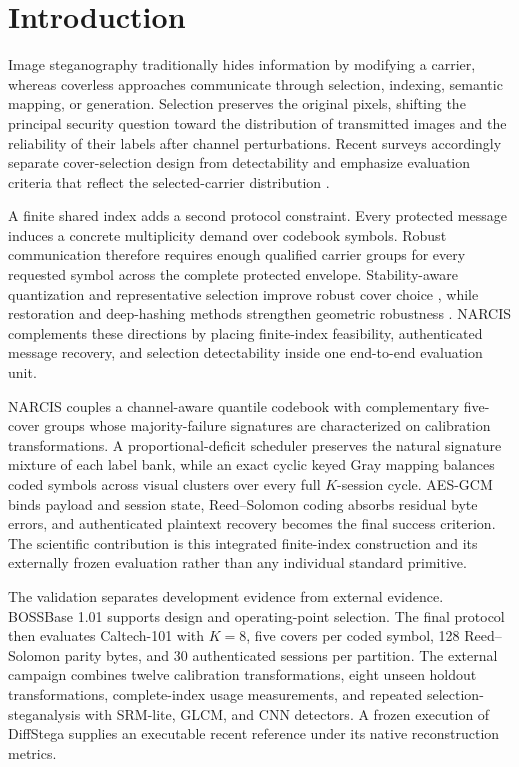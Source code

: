\section{Introduction}
\label{sec:intro}

Image steganography traditionally hides information by modifying a carrier, whereas coverless approaches communicate through selection, indexing, semantic mapping, or generation. Selection preserves the original pixels, shifting the principal security question toward the distribution of transmitted images and the reliability of their labels after channel perturbations. Recent surveys accordingly separate cover-selection design from detectability and emphasize evaluation criteria that reflect the selected-carrier distribution \cite{azam2025coversurvey,kombrink2025survey}.

A finite shared index adds a second protocol constraint. Every protected message induces a concrete multiplicity demand over codebook symbols. Robust communication therefore requires enough qualified carrier groups for every requested symbol across the complete protected envelope. Stability-aware quantization and representative selection improve robust cover choice \cite{guo2026capacity}, while restoration and deep-hashing methods strengthen geometric robustness \cite{meng2025restoration,tan2026hashing}. NARCIS complements these directions by placing finite-index feasibility, authenticated message recovery, and selection detectability inside one end-to-end evaluation unit.

NARCIS couples a channel-aware quantile codebook with complementary five-cover groups whose majority-failure signatures are characterized on calibration transformations. A proportional-deficit scheduler preserves the natural signature mixture of each label bank, while an exact cyclic keyed Gray mapping balances coded symbols across visual clusters over every full $K$-session cycle. AES-GCM binds payload and session state, Reed--Solomon coding absorbs residual byte errors, and authenticated plaintext recovery becomes the final success criterion. The scientific contribution is this integrated finite-index construction and its externally frozen evaluation rather than any individual standard primitive.

The validation separates development evidence from external evidence. BOSSBase 1.01 \cite{bas2011boss} supports design and operating-point selection. The final protocol then evaluates Caltech-101 \cite{feifei2004caltech101,caltech101data} with $K=8$, five covers per coded symbol, 128 Reed--Solomon parity bytes, and 30 authenticated sessions per partition. The external campaign combines twelve calibration transformations, eight unseen holdout transformations, complete-index usage measurements, and repeated selection-steganalysis with SRM-lite, GLCM, and CNN detectors. A frozen execution of DiffStega \cite{yang2024diffstega} supplies an executable recent reference under its native reconstruction metrics.

